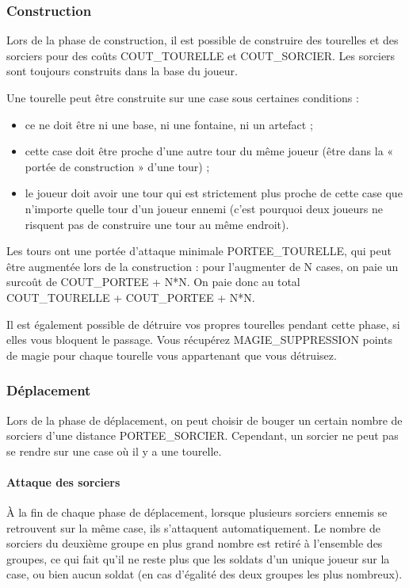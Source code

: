 \subsubsection{Construction}\label{construction}

Lors de la phase de construction, il est possible de construire des
tourelles et des sorciers pour des coûts COUT\_TOURELLE et COUT\_SORCIER. Les sorciers sont toujours construits dans la base du joueur.

Une tourelle peut être construite sur une case sous certaines conditions :
\begin{itemize}
\item ce ne doit être ni une base, ni une fontaine, ni un artefact ;
\item cette case doit être proche d'une autre tour du même joueur (être dans la « portée de
construction » d'une tour) ;
\item le joueur doit avoir une tour qui est
strictement plus proche de cette case que n'importe quelle tour d'un
joueur ennemi (c'est pourquoi deux joueurs ne risquent pas de construire
une tour au même endroit).
\end{itemize}

Les tours ont une portée d'attaque minimale PORTEE\_TOURELLE,
qui peut être augmentée lors de la construction : pour
l'augmenter de N cases, on paie un surcoût de
COUT\_PORTEE + N*N. On paie donc au total COUT\_TOURELLE + COUT\_PORTEE
+ N*N.

Il est également possible de détruire vos propres tourelles pendant
cette phase, si elles vous bloquent le passage. Vous récupérez
MAGIE\_SUPPRESSION points de magie pour chaque tourelle vous appartenant
que vous détruisez.

\subsubsection{Déplacement}\label{duxe9placement}

Lors de la phase de déplacement, on peut choisir de bouger un certain
nombre de sorciers d'une distance PORTEE\_SORCIER. Cependant, un sorcier
ne peut pas se rendre sur une case où il y a une tourelle.

\paragraph{Attaque des sorciers}\label{attaque-des-sorciers}

À la fin de chaque phase de déplacement, lorsque plusieurs sorciers
ennemis se retrouvent sur la même case, ils s'attaquent automatiquement.
Le nombre de sorciers du deuxième groupe en plus grand nombre est retiré
à l'ensemble des groupes, ce qui fait qu'il ne reste plus que les
soldats d'un unique joueur sur la case, ou bien aucun soldat (en cas
d'égalité des deux groupes les plus nombreux).

